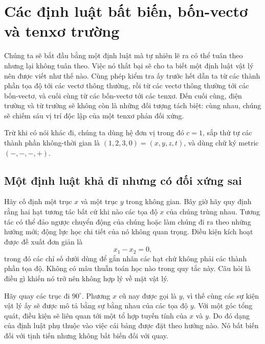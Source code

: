 \chapter{Các định luật bất biến, bốn-vectơ và tenxơ trường}

Chúng ta sẽ bắt đầu bằng một định luật mà tự nhiên lẽ ra có thể tuân theo nhưng lại không tuân theo. Việc nó thất bại sẽ cho ta biết một định luật vật lý nên được viết như thế nào. Cùng phép kiểm tra ấy trước hết dẫn ta từ các thành phần tọa độ tới các vectơ thông thường, rồi từ các vectơ thông thường tới các bốn-vectơ, và cuối cùng từ các bốn-vectơ tới các tenxơ. Đến cuối cùng, điện trường và từ trường sẽ không còn là những đối tượng tách biệt: cùng nhau, chúng sẽ chiếm sáu vị trí độc lập của một tenxơ phản đối xứng.

Trừ khi có nói khác đi, chúng ta dùng hệ đơn vị trong đó \(c=1\), sắp thứ tự các thành phần không-thời gian là \((1,2,3,0)=(x,y,z,t)\), và dùng chữ ký metric \((-,-,-,+)\).

\section{Một định luật khả dĩ nhưng có đối xứng sai}

Hãy cố định một trục \(x\) và một trục \(y\) trong không gian. Bây giờ hãy quy định rằng hai hạt tương tác bất cứ khi nào các tọa độ \(x\) của chúng trùng nhau. Tương tác có thể đảo ngược chuyển động của chúng hoặc làm chúng đi ra theo những hướng mới; động lực học chi tiết của nó không quan trọng. Điều kiện kích hoạt được đề xuất đơn giản là
\begin{equation}
  x_1-x_2=0,
\end{equation}
trong đó các chỉ số dưới dùng để gắn nhãn các hạt chứ không phải các thành phần tọa độ. Không có mâu thuẫn toán học nào trong quy tắc này. Câu hỏi là điều gì khiến nó trở nên không hợp lý về mặt vật lý.

\begin{classroomqa}
\end{classroomqa}

Hãy quay các trục đi \(90^\circ\). Phương \(x\) cũ nay được gọi là \(y\), vì thế cùng các sự kiện vật lý ấy sẽ được mô tả bằng sự bằng nhau của các tọa độ \(y\). Với một góc tổng quát, điều kiện sẽ liên quan tới một tổ hợp tuyến tính của \(x\) và \(y\). Do đó dạng của định luật phụ thuộc vào việc cái bảng được đặt theo hướng nào. Nó bất biến đối với tịnh tiến nhưng không bất biến đối với quay.

